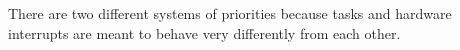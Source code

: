 There are two different systems of priorities because tasks and hardware
interrupts are meant to behave very differently from each other. 


